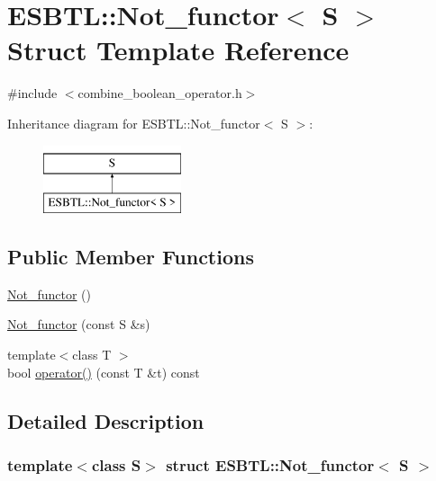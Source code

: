 \hypertarget{structESBTL_1_1Not__functor}{}\section{E\+S\+B\+TL\+:\+:Not\+\_\+functor$<$ S $>$ Struct Template Reference}
\label{structESBTL_1_1Not__functor}


{\ttfamily \#include $<$combine\+\_\+boolean\+\_\+operator.\+h$>$}

Inheritance diagram for E\+S\+B\+TL\+:\+:Not\+\_\+functor$<$ S $>$\+:\begin{figure}[H]
\begin{center}
\leavevmode
\includegraphics[height=2.000000cm]{structESBTL_1_1Not__functor}
\end{center}
\end{figure}
\subsection*{Public Member Functions}
\begin{DoxyCompactItemize}
\item 
\hyperlink{structESBTL_1_1Not__functor_a33d2670f7406276a8690e65bd1e5a6f7}{Not\+\_\+functor} ()
\item 
\hyperlink{structESBTL_1_1Not__functor_aab72e39a6e57edad9f2c15e59ec34836}{Not\+\_\+functor} (const S \&s)
\item 
{\footnotesize template$<$class T $>$ }\\bool \hyperlink{structESBTL_1_1Not__functor_a207c726758b2318efe580dd948d4d7a5}{operator()} (const T \&t) const
\end{DoxyCompactItemize}


\subsection{Detailed Description}
\subsubsection*{template$<$class S$>$\newline
struct E\+S\+B\+T\+L\+::\+Not\+\_\+functor$<$ S $>$}

